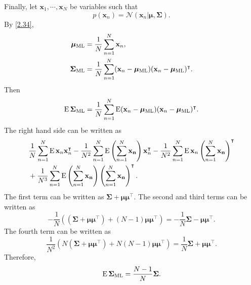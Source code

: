 Finally, let $\mathbf{x}_1, \cdots, \mathbf{x}_N$ be variables such that
%
\begin{equation}
p(\mathbf{x}_n)
=
\mathcal{N}
\left(
	\mathbf{x}_n
	|
	\bm{\mu},
	\bm{\Sigma}
\right).
\end{equation}
% 
By \ref{2.34},
%
\begin{equation}
\begin{aligned}
\bm{\mu}_{{\rm ML}}
&= 
\frac{1}{N}
\sum_{n = 1}^{N} 
\mathbf{x}_n,
\\
\bm{\Sigma}_{{\rm ML}}
&=
\frac{1}{N}
\sum_{n = 1}^{N}
(\mathbf{x}_n - \bm{\mu}_{\rm ML})
(\mathbf{x}_n - \bm{\mu}_{\rm ML}) ^ \intercal.
\end{aligned}
\end{equation}
%
Then
%
\begin{equation}
\operatorname{E} \bm{\Sigma}_{\rm ML}
=
\frac{1}{N}
\sum_{n = 1}^{N}
\operatorname{E}
(\mathbf{x}_n - \bm{\mu}_{\rm ML})
(\mathbf{x}_n - \bm{\mu}_{\rm ML}) ^ \intercal.
\end{equation}
%
The right hand side can be written as
%
\begin{equation}
\begin{aligned}
&
\frac{1}{N}
\sum_{n = 1}^{N}
\operatorname{E}
\mathbf{x}_n
\mathbf{x}_n ^ \intercal
-
\frac{1}{N ^ 2}
\sum_{n = 1}^{N}
\operatorname{E}
\left(
	\sum_{n = 1}^{N}
	\mathbf{x_n}
\right)
\mathbf{x}_n ^ \intercal
-
\frac{1}{N ^ 2}
\sum_{n = 1}^{N}
\operatorname{E}
\mathbf{x}_n
\left(
	\sum_{n = 1}^{N}
	\mathbf{x_n}
\right) ^ \intercal 
\\
&+
\frac{1}{N ^ 3}
\sum_{n = 1}^{N}
\operatorname{E}
\left(
	\sum_{n = 1}^{N}
	\mathbf{x_n}
\right)
\left(
	\sum_{n = 1}^{N}
	\mathbf{x_n}
\right) ^ \intercal.
\end{aligned}
\end{equation}
%
The first term can be written as $\bm{\Sigma} +  \bm{\mu} \bm{\mu} ^ \intercal$.
%
The second and third terms can be written as
%
\begin{equation}
-
\frac{1}{N}
\left(
	\left(
		\bm{\Sigma}
		+
		\bm{\mu} 
		\bm{\mu} ^ \intercal
	\right)
	+
	(N - 1) 
	\bm{\mu} 
	\bm{\mu} ^ \intercal
\right)
=
-
\frac{1}{N}
\bm{\Sigma}
-
\bm{\mu} 
\bm{\mu} ^ \intercal.
\end{equation}
%
The fourth term can be written as
%
\begin{equation}
\frac{1}{N ^ 2}
\left(
	N 
	\left(
		\bm{\Sigma}
		+
		\bm{\mu} 
		\bm{\mu} ^ \intercal
	\right)
	+
	N 
	(N - 1)
	\bm{\mu} 
	\bm{\mu} ^ \intercal
\right)
=
\frac{1}{N}
\bm{\Sigma}
+
\bm{\mu} 
\bm{\mu} ^ \intercal.
\end{equation}
%
Therefore,
%
\begin{equation}
\operatorname{E} \bm{\Sigma}_{\rm ML}
=
\frac{N - 1}{N} 
\bm{\Sigma}.
\end{equation}
%


